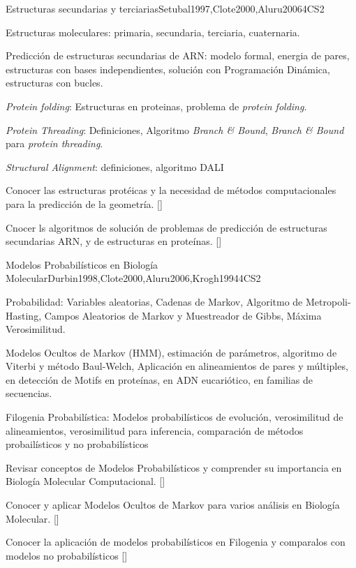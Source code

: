\begin{syllabus}
\begin{unit}{Estructuras secundarias y terciarias}{}{Setubal1997,Clote2000,Aluru2006}{4}{CS2}
   \begin{topics}
    \item Estructuras moleculares: primaria, secundaria, terciaria, cuaternaria.
    \item Predicción de estructuras secundarias de ARN: modelo formal, energia de pares, estructuras con bases independientes, solución con Programación Dinámica, estructuras con bucles.
    \item {\it Protein folding}: Estructuras en proteinas, problema de \textit{protein folding}.
    \item {\it Protein Threading}: Definiciones, Algoritmo \textit{Branch \& Bound}, \textit{Branch \& Bound} para \textit{protein threading}.
    \item {\it Structural Alignment}: definiciones, algoritmo DALI
   \end{topics}
   \begin{learningoutcomes}
     \item Conocer las estructuras protéicas y la necesidad de métodos computacionales para la predicción de la geometría. [\Familiarity]
	   \item Cnocer ls algoritmos de solución de problemas de predicción de estructuras secundarias ARN, y de estructuras en proteínas. [\Assessment]
   \end{learningoutcomes}
\end{unit}

\begin{unit}{Modelos Probabilísticos en Biología Molecular}{}{Durbin1998,Clote2000,Aluru2006,Krogh1994}{4}{CS2}
   \begin{topics}
    \item Probabilidad: Variables aleatorias, Cadenas de Markov, Algoritmo de Metropoli-Hasting, Campos Aleatorios de Markov y Muestreador de Gibbs, Máxima Verosimilitud.
    \item Modelos Ocultos de Markov (HMM), estimación de parámetros, algoritmo de Viterbi y método Baul-Welch, Aplicación en alineamientos de pares y múltiples, en detección de Motifs en proteínas, en ADN eucariótico, en familias de secuencias.
		\item Filogenia Probabilística: Modelos probabilísticos de evolución, verosimilitud de alineamientos, verosimilitud para inferencia, comparación de métodos probailísticos y no probabilísticos
   \end{topics}
   \begin{learningoutcomes}
      \item  Revisar conceptos de Modelos Probabilísticos y comprender su importancia en Biología Molecular Computacional. [\Assessment]
	  \item Conocer y aplicar Modelos Ocultos de Markov para varios análisis en Biología Molecular. [\Usage]
		\item Conocer la aplicación de modelos probabilísticos en Filogenia y comparalos con modelos no probabilísticos [\Assessment]
   \end{learningoutcomes}
\end{unit}


\end{syllabus}
